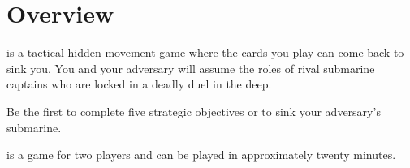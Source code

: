 \section*{Overview}
\PING{} is a tactical hidden-movement game where the cards you play can come back to sink you. You and your adversary will assume the roles of rival submarine captains who are locked in a deadly duel in the deep.

Be the first to complete five strategic objectives or to sink your adversary's submarine.

\PING{} is a game for two players and can be played in approximately twenty minutes.

